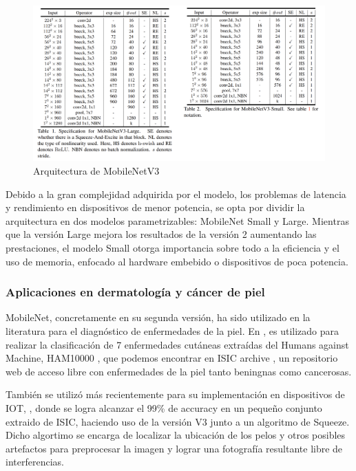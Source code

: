     \begin{figure}[H]
	\label{mv2}
	\centering
	\includegraphics[scale = 0.85]{imagenes/mobilev3.png}
	\caption{Arquitectura de MobileNetV3}
\end{figure}

Debido a la gran complejidad adquirida por el modelo, los problemas de latencia y rendimiento en dispositivos de menor potencia, se opta por dividir la arquitectura en dos modelos parametrizables: MobileNet Small y Large. Mientras que la versión Large mejora los resultados de la versión 2 aumentando las prestaciones, el modelo Small otorga importancia sobre todo a la eficiencia y el uso de memoria, enfocado al hardware embebido o dispositivos de poca potencia.


\subsubsection{Aplicaciones en dermatología y cáncer de piel}

MobileNet, concretamente en su segunda versión, ha sido utilizado en la literatura para el diagnóstico de enfermedades de la piel. En \cite{Chaturvedi_2020}, es utilizado para realizar la clasificación de 7 enfermedades cutáneas extraídas del Humans against Machine, HAM10000 \cite{ham10000}, que podemos encontrar en ISIC archive \cite{isicarchive}, un repositorio web de acceso libre con enfermedades de la piel tanto beningnas como cancerosas. 

También se utilizó más recientemente para su implementación en dispositivos de IOT, \cite{mnetsqueeze}, donde se logra alcanzar el 99\% de accuracy en un pequeño conjunto extraido de ISIC, haciendo uso de la versión V3 junto a un algoritmo de Squeeze. Dicho algortimo se encarga de localizar la ubicación de los pelos y otros posibles artefactos para preprocesar la imagen y lograr una fotografía resultante libre de interferencias. 

